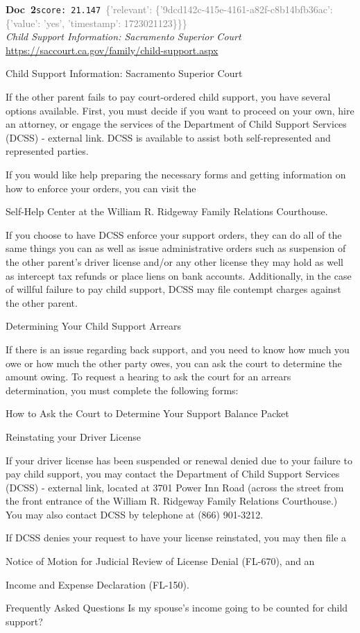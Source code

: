 \documentclass[a4paper,11pt]{article}
\begin{document}
\begin{docenv}
{\footnotesize\textcolor{doccolor}{\textbf{Doc~2}}}\hfill{\tiny\texttt{score:~21.147}}\ {\tiny\textcolor{gray}{\{'relevant': \{'9dcd142c-415e-4161-a82f-c8b14bfb36ac': \{'value': 'yes', 'timestamp': 1723021123\}\}\}}}\\[3pt]
{\small\textit{
	Child Support Information: Sacramento Superior Court
}}\\[2pt]
{\tiny\url{https://saccourt.ca.gov/family/child-support.aspx}}\\[4pt]
{\footnotesize 
	Child Support Information: Sacramento Superior Court

If the other parent fails to pay court-ordered child support, you have several 
 options available. First, you must decide if you want to proceed on your own, 
 hire an attorney, or engage the services of the 
 Department of Child Support Services (DCSS) - external link. DCSS is available to assist both self-represented and 
 represented parties.

 If you would like help preparing the necessary forms and getting information on 
 how to enforce your orders, you can visit the
 
 Self-Help Center at the 
 William R. Ridgeway Family Relations Courthouse.

 If you choose to have DCSS enforce your support orders, they can do all of the 
 same things you can as well as issue administrative orders such as suspension of 
 the other parent's driver license and/or any other license they may hold as 
 well as intercept tax refunds or place liens on bank accounts. 
 Additionally, in the case of willful failure to pay child support, DCSS may file 
 contempt charges against the other parent.

Determining Your Child Support Arrears

 If there is an issue regarding back support, and you need to know how much you
 owe or how much the other party owes, you can ask the court to determine the amount
 owing. To request a hearing to ask the court for an arrears determination, you
 must complete the following forms:


	How to Ask the Court to Determine Your Support Balance Packet

Reinstating your Driver License

 If your driver license has been suspended or renewal denied due to your 
 failure to pay child support, you may contact the 
 Department of Child Support Services (DCSS) - external link, located at 3701 Power Inn Road (across the street from the 
 front entrance of the William R. Ridgeway Family Relations Courthouse.) 
 You may also contact DCSS by telephone at (866) 901-3212.

 If DCSS denies your request to have your license reinstated, you may then file a 
 
 Notice of Motion for Judicial Review of License Denial (FL-670), and an 
 
 Income and Expense Declaration (FL-150).

Frequently Asked Questions
Is my spouse's income going to be counted for child support?}
\end{docenv}
\end{document}

